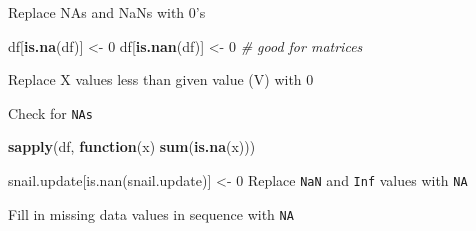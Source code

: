 \documentclass[10,portrait]{article}
\newenvironment{Shaded}{\begin{snugshade}}{\end{snugshade}}
\newcommand{\KeywordTok}[1]{\textcolor[rgb]{0.13,0.29,0.53}{\textbf{#1}}}
\newcommand{\DecValTok}[1]{\textcolor[rgb]{0.00,0.00,0.81}{#1}}
\newcommand{\StringTok}[1]{\textcolor[rgb]{0.31,0.60,0.02}{#1}}
\newcommand{\CommentTok}[1]{\textcolor[rgb]{0.56,0.35,0.01}{\textit{#1}}}
\newcommand{\OtherTok}[1]{\textcolor[rgb]{0.56,0.35,0.01}{#1}}
\newcommand{\ControlFlowTok}[1]{\textcolor[rgb]{0.13,0.29,0.53}{\textbf{#1}}}
\newcommand{\OperatorTok}[1]{\textcolor[rgb]{0.81,0.36,0.00}{\textbf{#1}}}
\newcommand{\NormalTok}[1]{#1}
\begin{document}
Replace NAs and NaNs with 0's

\begin{Shaded}
\begin{Highlighting}[]
\NormalTok{df[}\KeywordTok{is.na}\NormalTok{(df)] <-}\StringTok{ }\DecValTok{0}
\NormalTok{df[}\KeywordTok{is.nan}\NormalTok{(df)] <-}\StringTok{ }\DecValTok{0}  \CommentTok{# good for matrices }
\end{Highlighting}
\end{Shaded}

Replace X values less than given value (V) with 0

\begin{Shaded}
\end{Shaded}

Check for \texttt{NAs}

\begin{Shaded}
\begin{Highlighting}[]
\KeywordTok{sapply}\NormalTok{(df, }\ControlFlowTok{function}\NormalTok{(x) }\KeywordTok{sum}\NormalTok{(}\KeywordTok{is.na}\NormalTok{(x)))}
\end{Highlighting}
\end{Shaded}

snail.update{[}is.nan(snail.update){]} \textless{}- 0 Replace
\texttt{NaN} and \texttt{Inf} values with \texttt{NA}

\begin{Shaded}
\end{Shaded}

Fill in missing data values in sequence with \texttt{NA}
\end{document}
